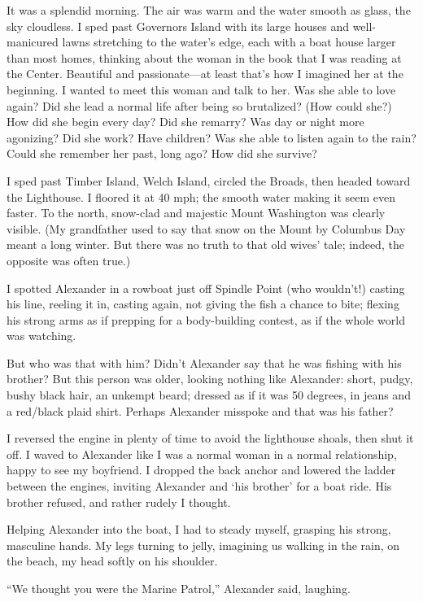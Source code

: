 It was a splendid morning. The air was warm and the water smooth as
glass, the sky cloudless. I sped past Governors Island with its large
houses and well-manicured lawns stretching to the water's edge, each
with a boat house larger than most homes, thinking about the woman in
the book that I was reading at the Center. Beautiful and passionate---at
least that's how I imagined her at the beginning. I wanted to meet this
woman and talk to her. Was she able to love again? Did she lead a normal
life after being so brutalized? (How could she?) How did she begin every
day? Did she remarry? Was day or night more agonizing? Did she work?
Have children? Was she able to listen again to the rain? Could she
remember her past, long ago? How did she survive?

I sped past Timber Island, Welch Island, circled the Broads, then headed
toward the Lighthouse. I floored it at 40 mph; the smooth water making
it seem even faster. To the north, snow-clad and majestic Mount
Washington was clearly visible. (My grandfather used to say that snow on
the Mount by Columbus Day meant a long winter. But there was no truth to
that old wives' tale; indeed, the opposite was often true.)

I spotted Alexander in a rowboat just off Spindle Point (who wouldn't!)
casting his line, reeling it in, casting again, not giving the fish a
chance to bite; flexing his strong arms as if prepping for a
body-building contest, as if the whole world was watching.

But who was that with him? Didn't Alexander say that he was fishing with
his brother? But this person was older, looking nothing like Alexander:
short, pudgy, bushy black hair, an unkempt beard; dressed as if it was
50 degrees, in jeans and a red/black plaid shirt. Perhaps Alexander
misspoke and that was his father?

I reversed the engine in plenty of time to avoid the lighthouse shoals,
then shut it off. I waved to Alexander like I was a normal woman in a
normal relationship, happy to see my boyfriend. I dropped the back
anchor and lowered the ladder between the engines, inviting Alexander
and `his brother' for a boat ride. His brother refused, and rather
rudely I thought.

Helping Alexander into the boat, I had to steady myself, grasping his
strong, masculine hands. My legs turning to jelly, imagining us walking
in the rain, on the beach, my head softly on his shoulder.

``We thought you were the Marine Patrol,'' Alexander said, laughing.

